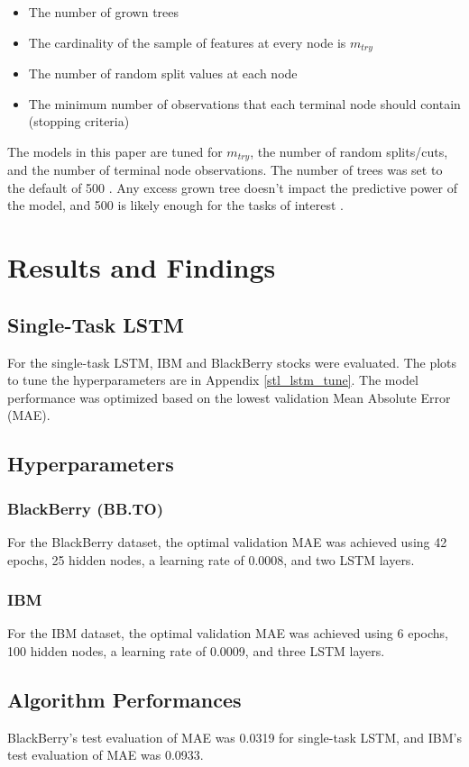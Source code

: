 \documentclass[conference]{IEEEtran}
\begin{document}
\begin{itemize}
\item The number of grown trees
\item The cardinality of the sample of features at every node is $m_{try}$
\item The number of random split values at each node
\item The minimum number of observations that each terminal node should contain (stopping criteria)
\end{itemize}

The models in this paper are tuned for $m_{try}$, the number of random splits/cuts, and the number
of terminal node observations. The number of trees was set to the default of 500 \cite{extratreedoc}.
Any excess grown tree doesn't impact the predictive power of the model, and 500 is likely enough for
the tasks of interest \cite{toomanytree}.

\section{Results and Findings}
\subsection{Single-Task LSTM}
For the single-task LSTM, IBM and BlackBerry stocks were evaluated. The plots to tune the hyperparameters
are in Appendix \ref{stl_lstm_tune}.
The model performance was optimized based on the lowest validation Mean Absolute Error (MAE). 
\subsection*{Hyperparameters}
\subsubsection*{BlackBerry (BB.TO)}
For the BlackBerry dataset, the optimal validation MAE was achieved using 42 epochs, 25 hidden nodes, a learning rate of 0.0008, and two LSTM layers.
\subsubsection*{IBM}
For the IBM dataset, the optimal validation MAE was achieved using 6 epochs, 100 hidden nodes, a learning rate of 0.0009, and three LSTM layers.
\subsection*{Algorithm Performances}
BlackBerry’s test evaluation of MAE was 0.0319 for single-task LSTM, and IBM’s test evaluation of MAE was 0.0933.
\end{document}
